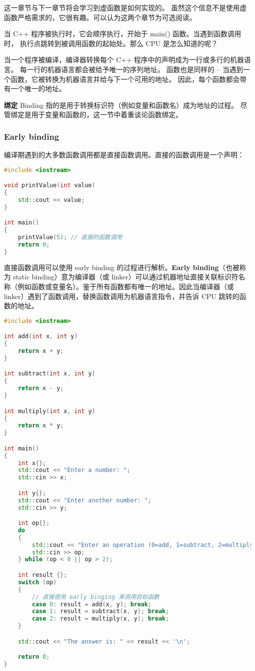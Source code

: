 \documentclass[../../LearnCpp.tex]{subfiles}
\begin{document}

这一章节与下一章节将会学习到虚函数是如何实现的。
虽然这个信息不是使用虚函数严格需求的，它很有趣。可以认为这两个章节为可选阅读。

当 C++ 程序被执行时，它会顺序执行，开始于 main() 函数。当遇到函数调用时，
执行点跳转到被调用函数的起始处。那么 CPU 是怎么知道的呢？

当一个程序被编译，编译器转换每个 C++ 程序中的声明成为一行或多行的机器语言。
每一行的机器语言都会被给予唯一的序列地址。
函数也是同样的 -- 当遇到一个函数，它被转换为机器语言并给与下一个可用的地址。
因此，每个函数都会带有一个唯一的地址。

\textbf{绑定} Binding 指的是用于转换标识符（例如变量和函数名）成为地址的过程。
尽管绑定是用于变量和函数的，这一节中着重谈论函数绑定。

\subsubsection*{Early binding}

编译期遇到的大多数函数调用都是直接函数调用。直接的函数调用是一个声明：

\begin{lstlisting}[language=C++]
#include <iostream>

void printValue(int value)
{
    std::cout << value;
}

int main()
{
    printValue(5); // 直接的函数调用
    return 0;
}
\end{lstlisting}

直接函数调用可以使用 early binding 的过程进行解析。\textbf{Early binding}（也被称为 static binding）意为编译器（或 linker）可以通过机器地址直接关联标识符名称（例如函数或变量名）。鉴于所有函数都有唯一的地址。因此当编译器（或 linker）遇到了函数调用，替换函数调用为机器语言指令，并告诉 CPU 跳转的函数的地址。

\begin{lstlisting}[language=C++]
#include <iostream>

int add(int x, int y)
{
    return x + y;
}

int subtract(int x, int y)
{
    return x - y;
}

int multiply(int x, int y)
{
    return x * y;
}

int main()
{
    int x{};
    std::cout << "Enter a number: ";
    std::cin >> x;

    int y{};
    std::cout << "Enter another number: ";
    std::cin >> y;

    int op{};
    do
    {
        std::cout << "Enter an operation (0=add, 1=subtract, 2=multiply): ";
        std::cin >> op;
    } while (op < 0 || op > 2);

    int result {};
    switch (op)
    {
        // 直接使用 early binging 来调用目标函数
        case 0: result = add(x, y); break;
        case 1: result = subtract(x, y); break;
        case 2: result = multiply(x, y); break;
    }

    std::cout << "The answer is: " << result << '\n';

    return 0;
}
\end{lstlisting}
\end{document}
